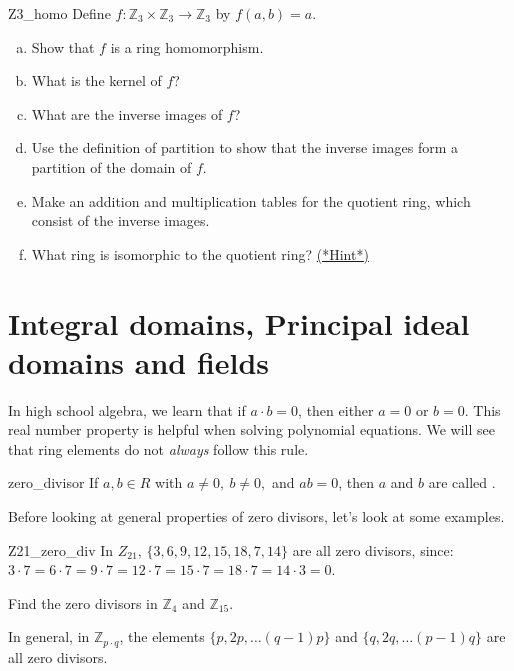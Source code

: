 \begin{exercise}{Z3_homo}
Define $f:{\mathbb Z}_3\times {\mathbb Z}_3\rightarrow {\mathbb Z}_3$ by $f(a,b)=a$.
\begin{enumerate}[(a)]
\item Show that $f$ is a ring homomorphism.
\item What is the kernel of $f$?
\item What are the inverse images of $f$?
\item Use the definition of partition to show that the inverse images form a partition of the domain of $f$.
\item Make an addition and multiplication tables for the quotient ring, which consist of the inverse images.
\item What ring is isomorphic to the quotient ring?  \hyperref[sec:Rings:Hints]{(*Hint*)} 
\end{enumerate}
\end{exercise}


\section{Integral domains, Principal ideal domains and fields}
\label{sec:Rings:IntegralDomainsPrincipalIdealDomains}

In high school algebra, we learn that if $a\cdot b=0$, then either $a=0$ or $b=0$.  This real number property is helpful when solving polynomial equations.  We will see that ring elements do not \emph{always} follow this rule.

\begin{defn}{zero_divisor}
If $a,b\in R$ with $a\neq 0,~b\neq 0,$ and $ab=0$, then $a$ and $b$ are called .
\end{defn}

Before looking at general properties of zero divisors, let's look at some examples.

\begin{example}{Z21_zero_div}
In $Z_{21}$, $\{3,6,9,12,15,18,7,14\}$ are all zero divisors, since:
$3\cdot 7=6\cdot 7=9\cdot 7=12\cdot 7=15\cdot 7=18\cdot 7=14\cdot 3=0$.
\end{example}

\begin{exercise}{}
Find the zero divisors in ${\mathbb Z}_4$ and ${\mathbb Z}_{15}$.
\end{exercise}

In general, in ${\mathbb Z}_{p\cdot q}$, the elements $\{p,2p,\dots(q-1)p\}$ and $\{q,2q,\dots (p-1)q\}$ are all zero divisors.  

